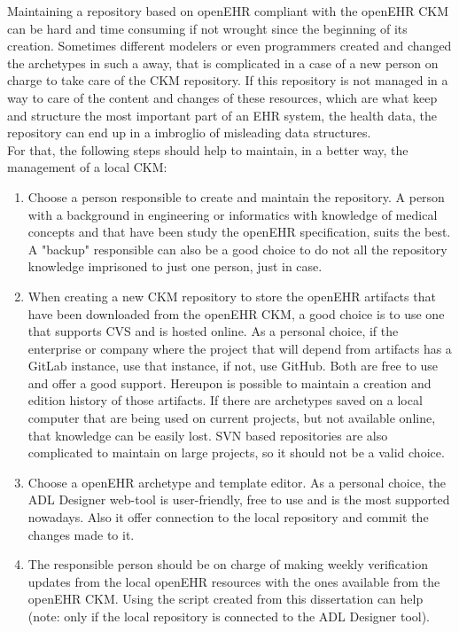 \documentclass[mim_thesis.tex]{subfiles}
\begin{document}
Maintaining a repository based on openEHR compliant with the openEHR CKM can be hard and time consuming if not wrought since the beginning of its creation. Sometimes different modelers or even programmers created and changed the archetypes in such a away, that is complicated in a case of a new person on charge to take care of the CKM repository. If this repository is not managed in a way to care of the content and changes of these resources, which are what keep and structure the most important part of an EHR system, the health data, the repository can end up in a imbroglio of misleading data structures. \\

For that, the following steps should help to maintain, in a better way, the management of a local CKM: 
\begin{enumerate}
\item Choose a person responsible to create and maintain the repository. A person with a background in engineering or informatics with knowledge of medical concepts and that have been study the openEHR specification, suits the best. A "backup" responsible can also be a good choice to do not all the repository knowledge imprisoned to just one person, just in case.
\item When creating a new CKM repository to store the openEHR artifacts that have been downloaded from the openEHR CKM, a good choice is to use one that supports \ac{CVS} and is hosted online. As a personal choice, if the enterprise or company where the project that will depend from artifacts has a GitLab instance, use that instance, if not, use GitHub. Both are free to use and offer a good support. Hereupon is possible to maintain a creation and edition history of those artifacts. If there are archetypes saved on a local computer that are being used on current projects, but not available online, that knowledge can be easily lost. \ac{SVN} based repositories are also complicated to maintain on large projects, so it should not be a valid choice. 
\item Choose a openEHR archetype and template editor. As a personal choice, the ADL Designer web-tool is user-friendly, free to use and is the most supported nowadays. Also it offer connection to the local repository and commit the changes made to it.  
\item The responsible person should be on charge of making weekly verification updates from the local openEHR resources with the ones available from the openEHR CKM. Using the script created from this dissertation can help (note: only if the local repository is connected to the ADL Designer tool). 

\end{enumerate}
\end{document}
